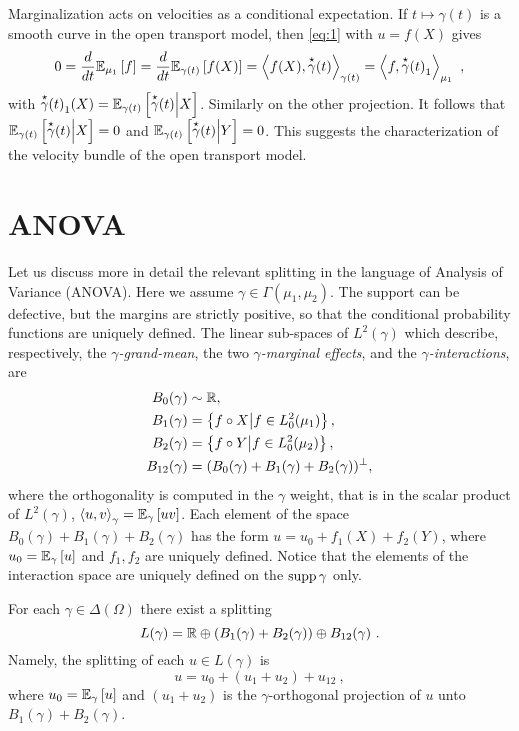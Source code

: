 \documentclass[runningheads]{llncs}
\begin{document}
Marginalization acts on velocities as a conditional expectation. If $t \mapsto \gamma(t)$ is a smooth curve in the open transport model, then \cref{eq:1} with $u = f(X)$ gives \begin{equation*} 0 = \derivby t \expectat {\mu_1} f =  \derivby t \expectat {\gamma(t)} {f(X)} = \scalarat {\gamma(t)}  {f(X)} {\velocity \gamma(t)} = \scalarat {\mu_1}  f {{\velocity \gamma(t)}_1} \ , \end{equation*} with ${\velocity \gamma(t)}_1(X) = \condexpectat {\gamma(t)} {\velocity \gamma(t)} X$. Similarly on the other projection. It follows that $\condexpectat {\gamma(t)} {\velocity \gamma(t)} X = 0$ and $\condexpectat {\gamma(t)} {\velocity \gamma(t)} Y = 0$. This suggests the characterization of the velocity bundle of the open transport model.

\section{ANOVA}

Let us discuss more in detail the relevant splitting in the language of Analysis of Variance (ANOVA). Here we assume $\gamma \in \Gamma(\mu_1,\mu_2)$. The support can be defective, but the margins are strictly positive, so that the conditional probability functions are uniquely defined. The linear sub-spaces of $L^2(\gamma)$ which describe, respectively, the \emph{$\gamma$-grand-mean}, the two \emph{$\gamma$-marginal effects}, and the \emph{$\gamma$-interactions}, are
\begin{equation}\label{eq:ANOVA-spaces} \begin{aligned} B_0(\gamma) &\sim \reals, \\ B_1(\gamma) &= \setof{f\circ X}{f \in L^2_0(\mu_1)},\\ B_2(\gamma) &= \setof{f\circ Y}{f \in L^2_0(\mu_2)},\\ B_{12}(\gamma) &= (B_0(\gamma) + B_1(\gamma) + B_2(\gamma))^\perp, \end{aligned} \end{equation}
where the orthogonality is computed in the $\gamma$ weight, that is in the scalar product of $L^2(\gamma)$, $\scalarat \gamma u v = \expectat \gamma {uv}$. Each element of the space $B_0(\gamma) + B_1(\gamma) + B_2(\gamma)$ has the form $u = u_0 + f_1(X) + f_2(Y)$, where $u_0 = \expectat \gamma u$ and $f_1,f_2$ are uniquely defined. Notice that the elements of the interaction space are uniquely defined on the $\suppof{\gamma}$ only. 

\begin{proposition}For each $\gamma \in \Delta(\Omega)$ there exist a splitting
%
\begin{equation*}
%
  L(\gamma) = \reals \oplus \left(B_1(\gamma) + B_2(\gamma)\right) \oplus B_{12}(\gamma) \ . 
\end{equation*}
%
Namely, the splitting of each $u \in L(\gamma)$ is
%
\begin{equation}
 \label{eq:ANOVA}
 u = u_0 + (u_1 + u_2) + u_{12} \ ,
\end{equation}
%
where $u_0=\expectat \gamma u$ and $(u_1+u_2)$ is the
$\gamma$-orthogonal projection of $u$ unto
$B_1(\gamma) + B_2(\gamma)$.
\end{proposition}
\end{document}
